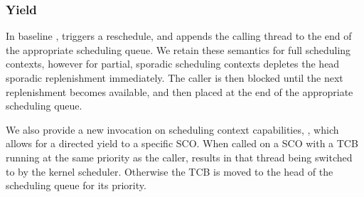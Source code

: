 \subsubsection{Yield}

In baseline \selfour, \yield triggers a reschedule, and appends the calling thread to the end of the
appropriate scheduling queue. We retain these semantics for full scheduling contexts, however 
for partial, sporadic scheduling contexts \yield depletes the head sporadic replenishment immediately. The
caller is then blocked until the next replenishment becomes available, and then placed at the end of
the appropriate scheduling queue.

We also provide a new invocation on scheduling context capabilities, \scyieldto, which allows for a directed
yield to a specific \gls{SCO}. When called on a \gls{SCO} with a \gls{TCB} running at the same
priority as the caller, \scyieldto results in that thread being switched to by the kernel scheduler.
Otherwise the \gls{TCB} is moved to the head of the scheduling queue for its priority.

